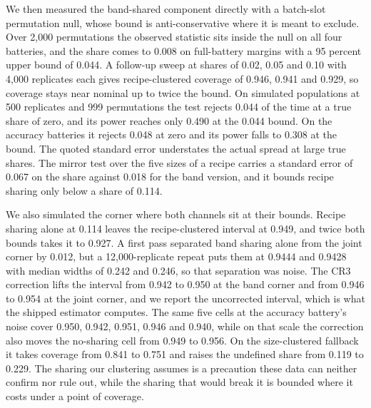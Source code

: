 We then measured the band-shared component directly with a batch-slot permutation null, whose bound is anti-conservative where it is meant to exclude. Over 2,000 permutations the observed statistic sits inside the null on all four batteries, and the share comes to 0.008 on full-battery margins with a 95 percent upper bound of 0.044. A follow-up sweep at shares of 0.02, 0.05 and 0.10 with 4,000 replicates each gives recipe-clustered coverage of 0.946, 0.941 and 0.929, so coverage stays near nominal up to twice the bound. On simulated populations at 500 replicates and 999 permutations the test rejects 0.044 of the time at a true share of zero, and its power reaches only 0.490 at the 0.044 bound. On the accuracy batteries it rejects 0.048 at zero and its power falls to 0.308 at the bound. The quoted standard error understates the actual spread at large true shares. The mirror test over the five sizes of a recipe carries a standard error of 0.067 on the share against 0.018 for the band version, and it bounds recipe sharing only below a share of 0.114.

We also simulated the corner where both channels sit at their bounds. Recipe sharing alone at 0.114 leaves the recipe-clustered interval at 0.949, and twice both bounds takes it to 0.927. A first pass separated band sharing alone from the joint corner by 0.012, but a 12,000-replicate repeat puts them at 0.9444 and 0.9428 with median widths of 0.242 and 0.246, so that separation was noise. The CR3 correction lifts the interval from 0.942 to 0.950 at the band corner and from 0.946 to 0.954 at the joint corner, and we report the uncorrected interval, which is what the shipped estimator computes. The same five cells at the accuracy battery's noise cover 0.950, 0.942, 0.951, 0.946 and 0.940, while on that scale the correction also moves the no-sharing cell from 0.949 to 0.956. On the size-clustered fallback it takes coverage from 0.841 to 0.751 and raises the undefined share from 0.119 to 0.229. The sharing our clustering assumes is a precaution these data can neither confirm nor rule out, while the sharing that would break it is bounded where it costs under a point of coverage.
